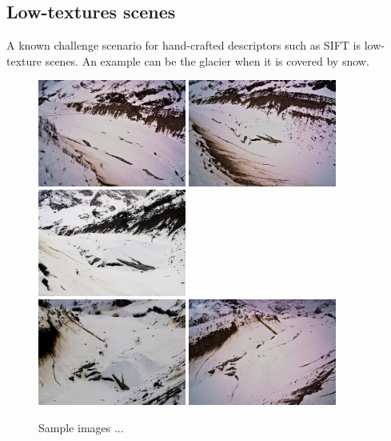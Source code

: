 

\subsection{Low-textures scenes}

A known challenge scenario for hand-crafted descriptors such as SIFT is low-texture scenes. 
An example can be the glacier when it is covered by snow.


\begin{figure}
  \centering
    \includegraphics[height=3.5cm]{winter_img_1}
    \includegraphics[height=3.5cm]{winter_img_2}
    \includegraphics[height=3.5cm]{winter_img_3} \\ \vspace{1mm}
    \includegraphics[height=3.5cm]{winter_img_4}
    \includegraphics[height=3.5cm]{winter_img_5}
  \caption{Sample images ...}
  \label{fig:5:castle_img}
\end{figure}


